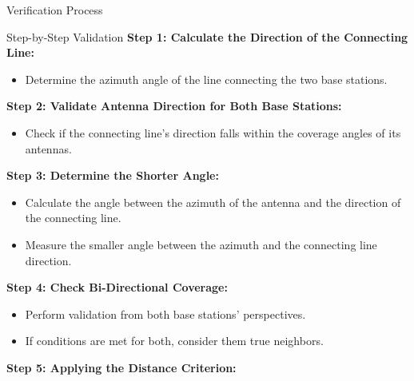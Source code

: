 \begin{frame}{Verification Process}
    \begin{block}{Step-by-Step Validation}
        \textbf{Step 1: Calculate the Direction of the Connecting Line:}
        \begin{itemize}
            \item Determine the azimuth angle of the line connecting the two base stations.
        \end{itemize}
        \textbf{Step 2: Validate Antenna Direction for Both Base Stations:}
        \begin{itemize}
            \item Check if the connecting line’s direction falls within the coverage angles of its antennas.
        \end{itemize}
        \textbf{Step 3: Determine the Shorter Angle:}
        \begin{itemize}
            \item Calculate the angle between the azimuth of the antenna and the direction of the connecting line.
            \item Measure the smaller angle between the azimuth and the connecting line direction.
        \end{itemize}
        \textbf{Step 4: Check Bi-Directional Coverage:}
        \begin{itemize}
            \item Perform validation from both base stations’ perspectives.
            \item If conditions are met for both, consider them true neighbors.
        \end{itemize}
        \textbf{Step 5: Applying the Distance Criterion:}
    \end{block}
\end{frame}

